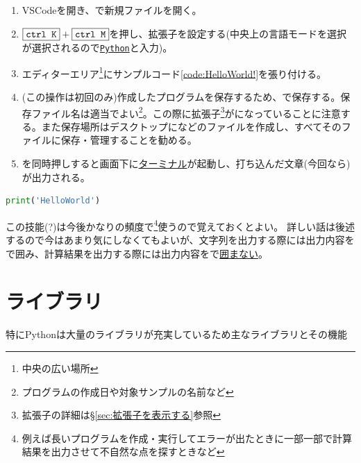 \documentclass[dvipdfmx, leqno]{jsreport}
\begin{document}
\begin{enumerate}
    \item VSCodeを開き、で新規ファイルを開く。
    \item $\fbox{\texttt{ctrl K}}+ \fbox{\texttt{ctrl M}}$を押し、拡張子を設定する(中央上の言語モードを選択が選択されるので\texttt{\underline{Python}}と入力)。
    \item エディターエリア\footnote{中央の広い場所}にサンプルコード\cref{code:HelloWorld!}を張り付ける。
    \item (この操作は初回のみ)作成したプログラムを保存するため、で保存する。保存ファイル名は適当でよい\footnote{プログラムの作成日や対象サンプルの名前など}。この際に拡張子\footnote{拡張子の詳細は\S\ref{sec:拡張子を表示する}参照}がになっていることに注意する。また保存場所はデスクトップになどのファイルを作成し、すべてそのファイルに保存・管理することを勧める。
    \item {}を同時押しすると画面下に\underline{ターミナル}が起動し、打ち込んだ文章(今回なら)が出力される。    
\end{enumerate}

\begin{lstlisting}[language=Python, caption={HelloWorld!},label={code:HelloWorld!}]
    print('HelloWorld')
\end{lstlisting}

    この技能(?)は今後かなりの頻度で\footnote{例えば長いプログラムを作成・実行してエラーが出たときに一部一部で計算結果を出力させて不自然な点を探すときなど}使うので覚えておくとよい。
    詳しい話は後述するので今はあまり気にしなくてもよいが、文字列を出力する際には出力内容をで囲み、計算結果を出力する際には出力内容をで\underline{囲まない}。

\section{ライブラリ}\label{sec:ライブラリ}%
    特にPythonは大量のライブラリが充実しているため主なライブラリとその機能
\end{document}
